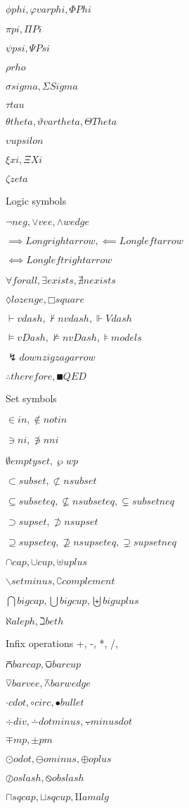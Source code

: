 \documentclass{article}
\begin{document}
$ϕ phi, φ varphi, Φ Phi$

$π pi, Π Pi$

$ψ psi, Ψ Psi$

$ρ rho$

$σ sigma, Σ Sigma$

$τ tau$

$θ theta, ϑ vartheta, Θ Theta$

$υ upsilon$

$ξ xi, Ξ Xi$

$ζ zeta$

Logic symbols

$¬ neg, ∨ vee, ∧ wedge$

$⟹ Longrightarrow, ⟸ Longleftarrow$

$⟺ Longleftrightarrow$

$∀ forall, ∃ exists, ∄ nexists$

$◊ lozenge, □ square$

$⊢ vdash, ⊬ nvdash, ⊩ Vdash$

$⊨ vDash, ⊭ nvDash, ⊧ models$

$↯ downzigzagarrow$

$∴ therefore, ∎ QED$

Set symbols

$∈ in, ∉ notin$

$∋ ni, ∌ nni$

$∅ emptyset, ℘ wp$

$⊂ subset, ⊄ nsubset$

$⊆ subseteq, ⊈ nsubseteq, ⊊ subsetneq$

$⊃ supset, ⊅ nsupset$

$⊇ supseteq, ⊉ nsupseteq, ⊋ supsetneq$

$∩ cap, ∪ cup, ⊎ uplus$

$∖ setminus, ∁ complement$

$⋂ bigcap, ⋃ bigcup, ⨄ biguplus$

$ℵ aleph, ℶ beth$

Infix operations +, -, *, /, %

$⩃ barcap, ⩂ barcup$

$⊽ barvee, ⊼ barwedge$

$⋅ cdot, ∘ circ, • bullet$

$÷ div, ∸ dotminus, ⨪ minusdot$

$∓ mp, ± pm$

$⊙ odot, ⊖ ominus, ⊕ oplus$

$⊘ oslash, ⦸ obslash$

$⊓ sqcap, ⊔ sqcup, ⨿ amalg$
\end{document}
